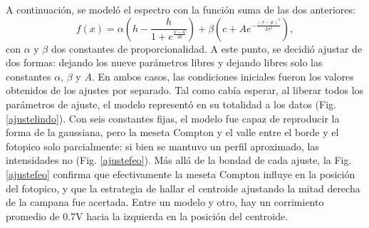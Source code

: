 \documentclass[twoside]{article}
\begin{document}
\begin{multicols}{2}
A continuación, se modeló el espectro con la función suma de las dos anteriores:
\begin{equation}
    f(x) = \alpha  \left ( h - \frac{h}{1 + e^{\frac{x - a}{4b}}} \right) + \beta \left(c + A e^{-\frac{(x - \mu)^2}{2\sigma^2}} \right),
\end{equation}
con $\alpha$ y $\beta$ dos constantes de proporcionalidad. A este punto, se decidió ajustar de dos formas: dejando los nueve parámetros libres y dejando libres solo las constantes $\alpha$, $\beta$ y $A$. En ambos casos, las condiciones iniciales fueron los valores obtenidos de los ajustes por separado. Tal como cabía esperar, al liberar todos los parámetros de ajuste, el modelo representó en su totalidad a los datos (Fig. \ref{ajustelindo}). Con seis constantes fijas, el modelo fue capaz de reproducir la forma de la gaussiana, pero la meseta Compton y el valle entre el borde y el fotopico solo parcialmente: si bien se mantuvo un perfil aproximado, las intensidades no (Fig. \ref{ajustefeo}). Más allá de la bondad de cada ajuste, la Fig. \ref{ajustefeo} confirma que efectivamente la meseta Compton influye en la posición del fotopico, y que la estrategia de hallar el centroide ajustando la mitad derecha de la campana fue acertada. Entre un modelo y otro, hay un corrimiento promedio de 0.7V hacia la izquierda en la posición del centroide. 

\bigskip
\bigskip
\bigskip



\end{multicols}
\end{document}
